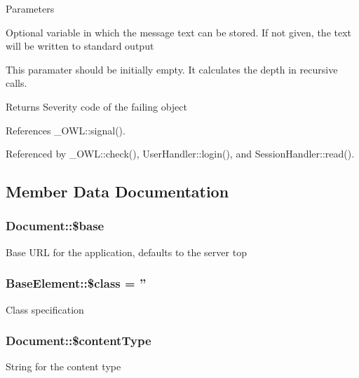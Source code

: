 \begin{DoxyParams}{Parameters}
\item[\mbox{\tt[out]} {\em \$text}]Optional variable in which the message text can be stored. If not given, the text will be written to standard output \item[\mbox{\tt[in]} {\em \$depth}]This paramater should be initially empty. It calculates the depth in recursive calls. \end{DoxyParams}
\begin{DoxyReturn}{Returns}
Severity code of the failing object 
\end{DoxyReturn}


References \_\-OWL::signal().



Referenced by \_\-OWL::check(), UserHandler::login(), and SessionHandler::read().



\subsection{Member Data Documentation}
\subsubsection[{\$base}]{\setlength{\rightskip}{0pt plus 5cm}Document::\$base}\label{classDocument_a5a5f2c002eaff3b5c0d0c2ef85b3496d}
Base URL for the application, defaults to the server top 
\subsubsection[{\$class}]{\setlength{\rightskip}{0pt plus 5cm}BaseElement::\$class = ''}\label{classBaseElement_a99976a8e967db92e7800309f359b0803}
Class specification 
\subsubsection[{\$contentType}]{\setlength{\rightskip}{0pt plus 5cm}Document::\$contentType}\label{classDocument_ab1cd325e8c6dc65ec0512e759d120b0e}
String for the content type 
